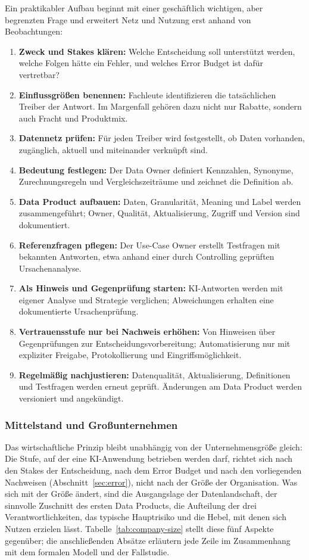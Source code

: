 \documentclass[a4paper,12pt]{article}
\theoremstyle{definition}
\begin{document}
Ein praktikabler Aufbau beginnt mit einer geschäftlich wichtigen, aber begrenzten Frage und erweitert Netz und Nutzung erst anhand von Beobachtungen:
\begin{enumerate}
\item \textbf{Zweck und Stakes klären:} Welche Entscheidung soll unterstützt werden, welche Folgen hätte ein Fehler, und welches Error Budget ist dafür vertretbar?
\item \textbf{Einflussgrößen benennen:} Fachleute identifizieren die tatsächlichen Treiber der Antwort. Im Margenfall gehören dazu nicht nur Rabatte, sondern auch Fracht und Produktmix.
\item \textbf{Datennetz prüfen:} Für jeden Treiber wird festgestellt, ob Daten vorhanden, zugänglich, aktuell und miteinander verknüpft sind.
\item \textbf{Bedeutung festlegen:} Der Data Owner definiert Kennzahlen, Synonyme, Zurechnungsregeln und Vergleichszeiträume und zeichnet die Definition ab.
\item \textbf{Data Product aufbauen:} Daten, Granularität, Meaning und Label werden zusammengeführt; Owner, Qualität, Aktualisierung, Zugriff und Version sind dokumentiert.
\item \textbf{Referenzfragen pflegen:} Der Use-Case Owner erstellt Testfragen mit bekannten Antworten, etwa anhand einer durch Controlling geprüften Ursachenanalyse.
\item \textbf{Als Hinweis und Gegenprüfung starten:} KI-Antworten werden mit eigener Analyse und Strategie verglichen; Abweichungen erhalten eine dokumentierte Ursachenprüfung.
\item \textbf{Vertrauensstufe nur bei Nachweis erhöhen:} Von Hinweisen über Gegenprüfungen zur Entscheidungsvorbereitung; Automatisierung nur mit expliziter Freigabe, Protokollierung und Eingriffsmöglichkeit.
\item \textbf{Regelmäßig nachjustieren:} Datenqualität, Aktualisierung, Definitionen und Testfragen werden erneut geprüft. Änderungen am Data Product werden versioniert und angekündigt.
\end{enumerate}

\subsubsection{Mittelstand und Großunternehmen}
\label{sec:company-size}
Das wirtschaftliche Prinzip bleibt unabhängig von der Unternehmensgröße gleich: Die Stufe, auf der eine KI-Anwendung betrieben werden darf, richtet sich nach den Stakes der Entscheidung, nach dem Error Budget und nach den vorliegenden Nachweisen (Abschnitt~\ref{sec:error}), nicht nach der Größe der Organisation. Was sich mit der Größe ändert, sind die Ausgangslage der Datenlandschaft, der sinnvolle Zuschnitt des ersten Data Products, die Aufteilung der drei Verantwortlichkeiten, das typische Hauptrisiko und die Hebel, mit denen sich Nutzen erzielen lässt. Tabelle~\ref{tab:company-size} stellt diese fünf Aspekte gegenüber; die anschließenden Absätze erläutern jede Zeile im Zusammenhang mit dem formalen Modell und der Fallstudie.
\end{document}
